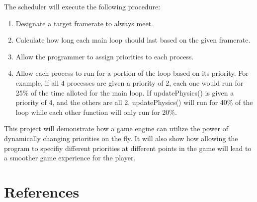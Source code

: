 \documentclass[a4paper, 12pt]{article}
\begin{document}
        The scheduler will execute the following procedure:
        \begin{enumerate}
            \item{Designate a target framerate to always meet.}
            \item{Calculate how long each main loop should last based on the given framerate.}
            \item{Allow the programmer to assign priorities to each process.}
            \item{Allow each process to run for a portion of the loop based on its priority. For example, if all 4 processes are given a priority of 2, each one would run for 25\% of the time alloted for the main loop. If updatePhysics() is given a priority of 4, and the others are all 2, updatePhysics() will run for 40\% of the loop while each other function will only run for 20\%.}
        \end{enumerate}

        This project will demonstrate how a game engine can utilize the power of dynamically changing priorities on the fly. It will also show how allowing the program to specifiy different priorities at different points in the game will lead to a smoother game experience for the player. 

\newpage

\section{References}
\end{document}
